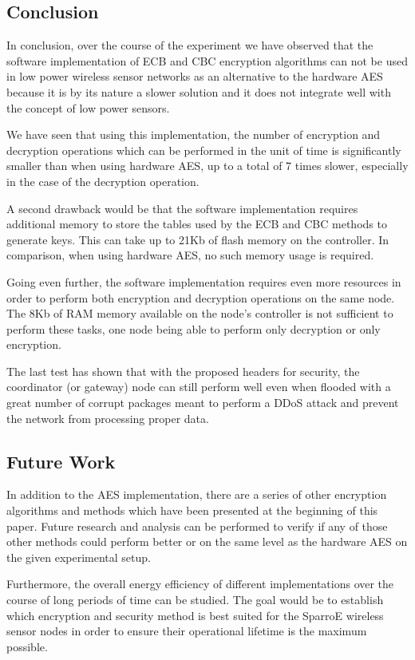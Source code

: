 \subsection{Conclusion}
In conclusion, over the course of the experiment we have observed that the 
software implementation of ECB and CBC encryption algorithms can not be used in low 
power wireless sensor networks as an alternative to the hardware AES because it 
is by its nature a slower solution and it does not integrate well with the 
concept of low power sensors.

We have seen that using this implementation, the number of encryption 
and decryption operations which can be performed in the unit of time 
is significantly smaller than when using hardware AES, up to a total 
of 7 times slower, especially in the case of the decryption operation.

A second drawback would be that the software implementation requires 
additional memory to store the tables used by the ECB and CBC methods 
to generate keys. This can take up to 21Kb of flash memory on the controller.
In comparison, when using hardware AES, no such memory usage is required.

Going even further, the software implementation requires even more resources 
in order to perform both encryption and decryption operations on the same node. The 8Kb of 
RAM memory available on the node's controller is not sufficient to perform these tasks, one node
being able to perform only decryption or only encryption.

The last test has shown that with the proposed headers for security, the coordinator (or 
gateway) node can still perform well even when flooded with a great number of corrupt 
packages meant to perform a DDoS attack and prevent the network from processing 
proper data.

\subsection{Future Work}
In addition to the AES implementation, there are a series of other encryption algorithms 
and methods which have been presented at the beginning of this paper. Future research and 
analysis can be performed to verify if any of those other methods could perform better or on 
the same level as the hardware AES on the given experimental setup.

Furthermore, the overall energy efficiency of different implementations over the course of 
long periods of time can be studied. The goal would be to establish which encryption and 
security method is best suited for the SparroE wireless sensor nodes in order to ensure 
their operational lifetime is the maximum possible.
